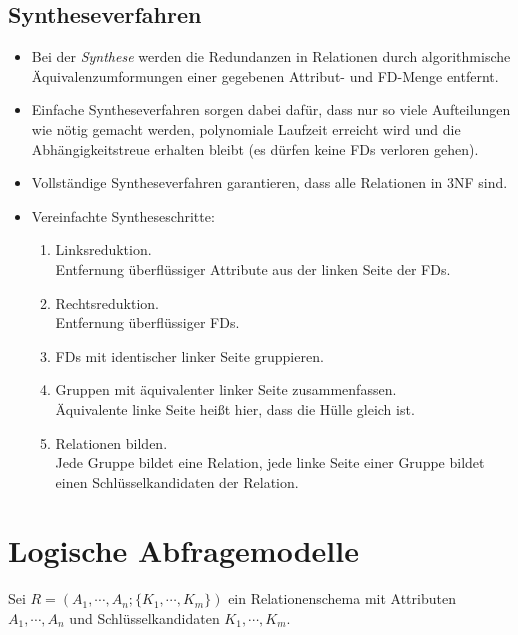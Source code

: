     \section{Syntheseverfahren} %
        \begin{itemize}
        	\item Bei der \textit{Synthese} werden die Redundanzen in Relationen durch algorithmische Äquivalenzumformungen einer gegebenen Attribut- und FD-Menge entfernt.
        	\item Einfache Syntheseverfahren sorgen dabei dafür, dass nur so viele Aufteilungen wie nötig gemacht werden, polynomiale Laufzeit erreicht wird und die Abhängigkeitstreue erhalten bleibt (es dürfen keine FDs verloren gehen).
        	\item Vollständige Syntheseverfahren garantieren, dass alle Relationen in 3NF sind.
        	\item Vereinfachte Syntheseschritte:
        		\begin{enumerate}
        			\item Linksreduktion. \\ Entfernung überflüssiger Attribute aus der linken Seite der FDs.
        			\item Rechtsreduktion. \\ Entfernung überflüssiger FDs.
        			\item FDs mit identischer linker Seite gruppieren.
        			\item Gruppen mit äquivalenter linker Seite zusammenfassen. \\ Äquivalente linke Seite heißt hier, dass die Hülle gleich ist.
        			\item Relationen bilden. \\ Jede Gruppe bildet eine Relation, jede linke Seite einer Gruppe bildet einen Schlüsselkandidaten der Relation.
        		\end{enumerate}
        \end{itemize}

\chapter{Logische Abfragemodelle} %
    \label{c:logicquery}
    
    Sei \( R = (A_1, \cdots, A_n; \{ K_1, \cdots, K_m \}) \) ein Relationenschema mit Attributen \( A_1, \cdots, A_n \) und Schlüsselkandidaten \( K_1, \cdots, K_m \).
    
